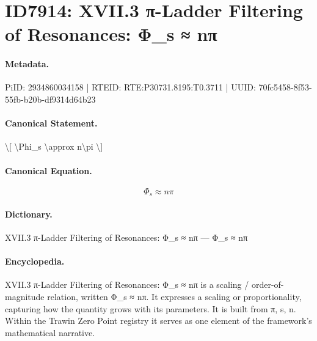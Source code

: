 \section*{ID7914: XVII.3 π-Ladder Filtering of Resonances: Φ\_s ≈ nπ}
\paragraph{Metadata.}
PiID: 2934860034158 | RTEID: RTE:P30731.8195:T0.3711 | UUID: 70fc5458-8f53-55fb-b20b-df9314d64b23

\paragraph{Canonical Statement.}
\textbackslash{}[ \textbackslash{}Phi\_s \textbackslash{}approx n\textbackslash{}pi \textbackslash{}]

\paragraph{Canonical Equation.}
\[
\Phi_s \approx n\pi
\]

\paragraph{Dictionary.}
XVII.3 π-Ladder Filtering of Resonances: Φ\_s ≈ nπ — Φ\_s ≈ nπ

\paragraph{Encyclopedia.}
XVII.3 π-Ladder Filtering of Resonances: Φ\_s ≈ nπ is a scaling / order-of-magnitude relation, written Φ\_s ≈ nπ. It expresses a scaling or proportionality, capturing how the quantity grows with its parameters. It is built from π, s, n. Within the Trawin Zero Point registry it serves as one element of the framework's mathematical narrative.
